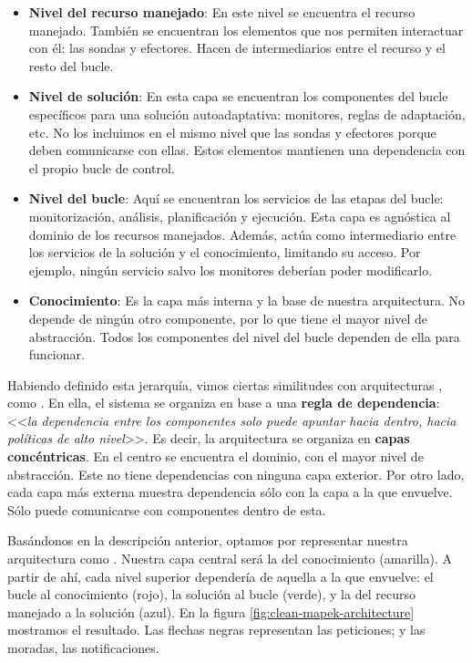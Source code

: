 \begin{itemize}
  \item \textbf{Nivel del recurso manejado}: En este nivel se encuentra el recurso manejado. También se encuentran los elementos que nos permiten interactuar con él: las sondas y efectores. Hacen de intermediarios entre el recurso y el resto del bucle.

  \item \textbf{Nivel de solución}: En esta capa se encuentran los componentes del bucle específicos para una solución autoadaptativa: monitores, reglas de adaptación, etc. No los incluimos en el mismo nivel que las sondas y efectores porque deben comunicarse con ellas. Estos elementos mantienen una dependencia con el propio bucle de control.

  \item \textbf{Nivel del bucle}: Aquí se encuentran los servicios de las etapas del bucle: monitorización, análisis, planificación y ejecución. Esta capa es agnóstica al dominio de los recursos manejados. Además, actúa como intermediario entre los servicios de la solución y el conocimiento, limitando su acceso. Por ejemplo, ningún servicio salvo los monitores deberían poder modificarlo.

  \item \textbf{Conocimiento}: Es la capa más interna y la base de nuestra arquitectura. No depende de ningún otro componente, por lo que tiene el mayor nivel de abstracción. Todos los componentes del nivel del bucle dependen de ella para funcionar.

\end{itemize}

Habiendo definido esta jerarquía, vimos ciertas similitudes con arquitecturas , como . \cite{martinChapter22Clean2018a} En ella, el sistema se organiza en base a una \textbf{regla de dependencia}: <<\emph{la dependencia entre los componentes solo puede apuntar hacia dentro, hacia políticas de alto nivel}>>. Es decir, la arquitectura se organiza en \textbf{capas concéntricas}. En el centro se encuentra el dominio, con el mayor nivel de abstracción. Este no tiene dependencias con ninguna capa exterior. Por otro lado, cada capa más externa muestra dependencia sólo con la capa a la que envuelve. Sólo puede comunicarse con componentes dentro de esta.

Basándonos en la descripción anterior, optamos por representar nuestra arquitectura como . \cite{taylorSoftwareArchitectureFoundations2009} Nuestra capa central será la del conocimiento (amarilla). A partir de ahí, cada nivel superior dependería de aquella a la que envuelve: el bucle al conocimiento (rojo), la solución al bucle (verde), y la del recurso manejado a la solución (azul). En la figura \ref{fig:clean-mapek-architecture} mostramos el resultado. Las flechas negras representan las peticiones; y las moradas, las notificaciones.

